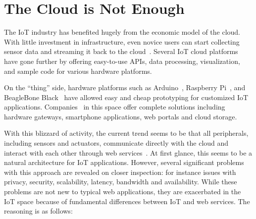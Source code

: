\section{The Cloud is Not Enough}
\label{sec:cloud-not-enough}

The IoT industry has benefited hugely from the economic model of the cloud.
With little investment in infrastructure, even novice users can start collecting
sensor data and streaming it back to the cloud~\cite{armbrust2010view}.  Several
IoT cloud platforms~\cite{carriots, grovestreams, xively, sami} have gone
further by offering easy-to-use APIs, data processing, visualization, and sample
code for various hardware platforms.

On the ``thing'' side, hardware platforms such as Arduino~\cite{arduino},
Raspberry Pi~\cite{rpi}, and BeagleBone Black~\cite{bbb} have allowed easy and
cheap prototyping for customized IoT applications.  Companies~\cite{ninja,
  smartthings, wink} in this space offer complete solutions including hardware
gateways, smartphone applications, web portals and cloud storage.

With this blizzard of activity, the current trend seems to be that all
peripherals, including sensors and actuators, communicate directly with the
cloud and interact with each other through web services~\cite{lee2014swarm}.  At
first glance, this seems to be a natural architecture for IoT applications.
However, several significant problems with this approach are revealed on closer
inspection: for instance issues with privacy, security, scalability, latency,
bandwidth and availability.  While these problems are not new to typical web
applications, they are exacerbated in the IoT space because of fundamental
differences between IoT and web services. The reasoning is as follows:

